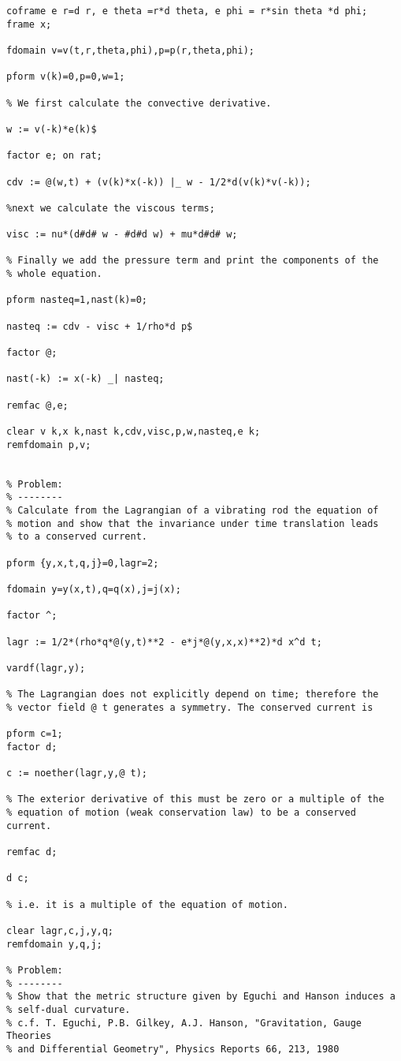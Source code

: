{\begin{verbatim}
coframe e r=d r, e theta =r*d theta, e phi = r*sin theta *d phi;
frame x;

fdomain v=v(t,r,theta,phi),p=p(r,theta,phi);

pform v(k)=0,p=0,w=1;

% We first calculate the convective derivative.

w := v(-k)*e(k)$

factor e; on rat;

cdv := @(w,t) + (v(k)*x(-k)) |_ w - 1/2*d(v(k)*v(-k));

%next we calculate the viscous terms;

visc := nu*(d#d# w - #d#d w) + mu*d#d# w;

% Finally we add the pressure term and print the components of the
% whole equation.

pform nasteq=1,nast(k)=0;

nasteq := cdv - visc + 1/rho*d p$

factor @;

nast(-k) := x(-k) _| nasteq;

remfac @,e;

clear v k,x k,nast k,cdv,visc,p,w,nasteq,e k;
remfdomain p,v;


% Problem:
% --------
% Calculate from the Lagrangian of a vibrating rod the equation of
% motion and show that the invariance under time translation leads
% to a conserved current.

pform {y,x,t,q,j}=0,lagr=2;

fdomain y=y(x,t),q=q(x),j=j(x);

factor ^;

lagr := 1/2*(rho*q*@(y,t)**2 - e*j*@(y,x,x)**2)*d x^d t;

vardf(lagr,y);

% The Lagrangian does not explicitly depend on time; therefore the
% vector field @ t generates a symmetry. The conserved current is

pform c=1;
factor d;

c := noether(lagr,y,@ t);

% The exterior derivative of this must be zero or a multiple of the
% equation of motion (weak conservation law) to be a conserved current.

remfac d;

d c;

% i.e. it is a multiple of the equation of motion.

clear lagr,c,j,y,q;
remfdomain y,q,j;

% Problem:
% --------
% Show that the metric structure given by Eguchi and Hanson induces a
% self-dual curvature.
% c.f. T. Eguchi, P.B. Gilkey, A.J. Hanson, "Gravitation, Gauge Theories
% and Differential Geometry", Physics Reports 66, 213, 1980


\end{verbatim}}
